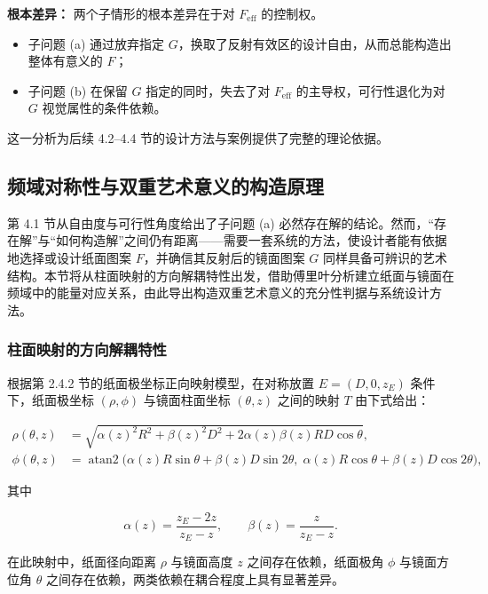 \documentclass[12pt,a4paper]{ctexart}
\begin{document}
\textbf{根本差异：} 两个子情形的根本差异在于对 $F_{\mathrm{eff}}$ 的控制权。
\begin{itemize}
    \item 子问题 (a) 通过放弃指定 $G$，换取了反射有效区的设计自由，从而总能构造出整体有意义的 $F$；
    \item 子问题 (b) 在保留 $G$ 指定的同时，失去了对 $F_{\mathrm{eff}}$ 的主导权，可行性退化为对 $G$ 视觉属性的条件依赖。
\end{itemize}
这一分析为后续 4.2--4.4 节的设计方法与案例提供了完整的理论依据。


\subsection{频域对称性与双重艺术意义的构造原理}

第 4.1 节从自由度与可行性角度给出了子问题 (a) 必然存在解的结论。然而，``存在解''与``如何构造解''之间仍有距离——需要一套系统的方法，使设计者能有依据地选择或设计纸面图案 $F$，并确信其反射后的镜面图案 $G$ 同样具备可辨识的艺术结构。本节将从柱面映射的方向解耦特性出发，借助傅里叶分析建立纸面与镜面在频域中的能量对应关系，由此导出构造双重艺术意义的充分性判据与系统设计方法。

\subsubsection{柱面映射的方向解耦特性}

根据第 2.4.2 节的纸面极坐标正向映射模型，在对称放置 $E=(D,0,z_E)$ 条件下，纸面极坐标 $(\rho,\phi)$ 与镜面柱面坐标 $(\theta,z)$ 之间的映射 $T$ 由下式给出：

\[
\begin{aligned}
\rho(\theta,z) &= \sqrt{\alpha(z)^2 R^2 + \beta(z)^2 D^2 + 2\alpha(z)\beta(z)RD\cos\theta},\\
\phi(\theta,z) &= \operatorname{atan2}\!\bigl(\alpha(z)R\sin\theta + \beta(z)D\sin2\theta,\;
\alpha(z)R\cos\theta + \beta(z)D\cos2\theta\bigr),
\end{aligned}
\]

其中

\[
\alpha(z)=\frac{z_E-2z}{z_E-z},\qquad \beta(z)=\frac{z}{z_E-z}.
\]

在此映射中，纸面径向距离 $\rho$ 与镜面高度 $z$ 之间存在依赖，纸面极角 $\phi$ 与镜面方位角 $\theta$ 之间存在依赖，两类依赖在耦合程度上具有显著差异。
\end{document}
